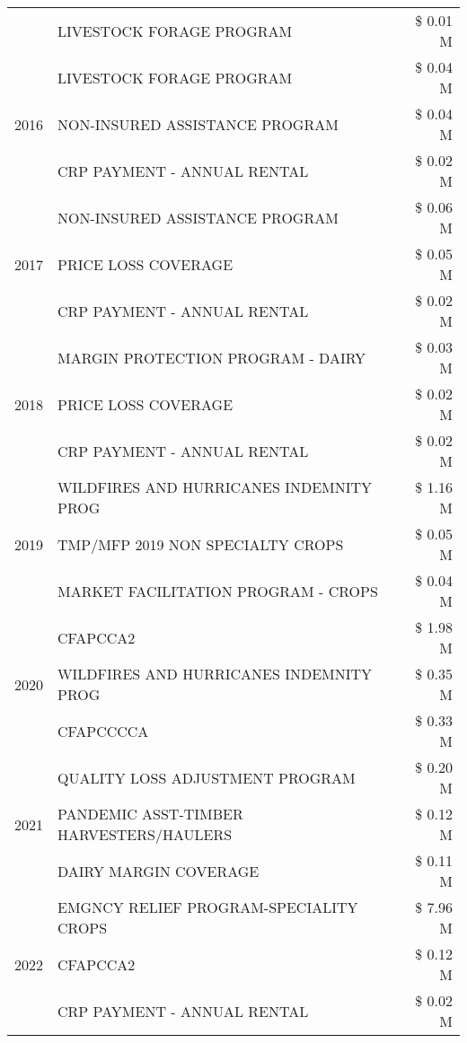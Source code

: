 \begin{tabular}{llr}
 & LIVESTOCK FORAGE PROGRAM & \$ 0.01 M \\
\cline{1-3}
\multirow[t]{3}{*}{2016} & LIVESTOCK FORAGE PROGRAM & \$ 0.04 M \\
 & NON-INSURED ASSISTANCE PROGRAM & \$ 0.04 M \\
 & CRP PAYMENT - ANNUAL RENTAL & \$ 0.02 M \\
\cline{1-3}
\multirow[t]{3}{*}{2017} & NON-INSURED ASSISTANCE PROGRAM & \$ 0.06 M \\
 & PRICE LOSS COVERAGE & \$ 0.05 M \\
 & CRP PAYMENT - ANNUAL RENTAL & \$ 0.02 M \\
\cline{1-3}
\multirow[t]{3}{*}{2018} & MARGIN PROTECTION PROGRAM - DAIRY & \$ 0.03 M \\
 & PRICE LOSS COVERAGE & \$ 0.02 M \\
 & CRP PAYMENT - ANNUAL RENTAL & \$ 0.02 M \\
\cline{1-3}
\multirow[t]{3}{*}{2019} & WILDFIRES AND HURRICANES INDEMNITY PROG & \$ 1.16 M \\
 & TMP/MFP 2019 NON SPECIALTY CROPS & \$ 0.05 M \\
 & MARKET FACILITATION PROGRAM - CROPS & \$ 0.04 M \\
\cline{1-3}
\multirow[t]{3}{*}{2020} & CFAPCCA2 & \$ 1.98 M \\
 & WILDFIRES AND HURRICANES INDEMNITY PROG & \$ 0.35 M \\
 & CFAPCCCCA & \$ 0.33 M \\
\cline{1-3}
\multirow[t]{3}{*}{2021} & QUALITY LOSS ADJUSTMENT PROGRAM & \$ 0.20 M \\
 & PANDEMIC ASST-TIMBER HARVESTERS/HAULERS & \$ 0.12 M \\
 & DAIRY MARGIN COVERAGE & \$ 0.11 M \\
\cline{1-3}
\multirow[t]{3}{*}{2022} & EMGNCY RELIEF PROGRAM-SPECIALITY CROPS & \$ 7.96 M \\
 & CFAPCCA2 & \$ 0.12 M \\
 & CRP PAYMENT - ANNUAL RENTAL & \$ 0.02 M \\
\cline{1-3}
\bottomrule
\end{tabular}
